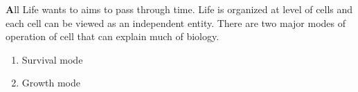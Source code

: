 \textbf
All Life wants to aims to pass through time. Life is organized at level of cells and each cell can be viewed as an independent entity. There are two major modes of operation of cell that can explain much of biology.
\begin{enumerate}
\item Survival mode
\item Growth mode
\end{enumerate}